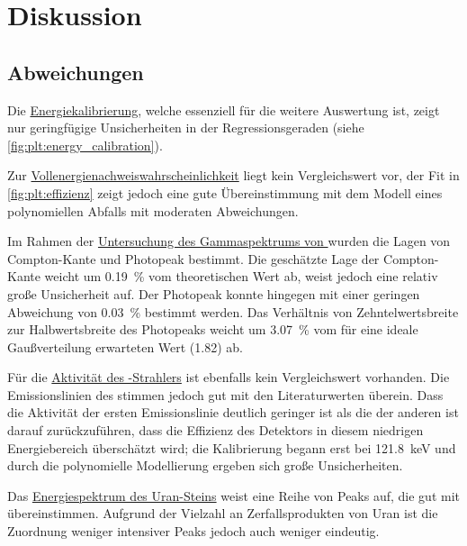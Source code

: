 \section{Diskussion}
\label{sec:diskussion}

\subsection{Abweichungen}
Die \hyperref[sec:auswertung:energiekalibrierung]{Energiekalibrierung},
    welche essenziell für die weitere Auswertung ist,
zeigt nur geringfügige Unsicherheiten in der Regressionsgeraden (siehe \autoref{fig:plt:energy_calibration}).

Zur \hyperref[sec:auswertung:effizienz]{Vollenergienachweiswahrscheinlichkeit} liegt kein Vergleichswert vor,
der Fit in \autoref{fig:plt:effizienz} zeigt jedoch eine gute Übereinstimmung mit dem Modell eines polynomiellen Abfalls mit moderaten Abweichungen.

Im Rahmen der \hyperref[sec:auswertung:Cs_137]{Untersuchung des Gammaspektrums von }
wurden die Lagen von Compton-Kante und Photopeak bestimmt.
Die geschätzte Lage der Compton-Kante weicht um \SI{0.19}{\percent} vom theoretischen Wert ab,
weist jedoch eine relativ große Unsicherheit auf.
Der Photopeak konnte hingegen mit einer geringen Abweichung von \SI{0.03}{\percent} bestimmt werden.
Das Verhältnis von Zehntelwertsbreite zur Halbwertsbreite des Photopeaks
weicht um \SI{3.07}{\percent} vom für eine ideale Gaußverteilung erwarteten Wert (\num{1.82}) ab.

Für die \hyperref[sec:auswertung:Ba_133]{Aktivität des -Strahlers} ist ebenfalls kein Vergleichswert vorhanden.
Die Emissionslinien des  stimmen jedoch gut mit den Literaturwerten \cite{lara} überein.
Dass die Aktivität der ersten Emissionslinie deutlich geringer ist als die der anderen %
ist darauf zurückzuführen,
dass die Effizienz des Detektors in diesem niedrigen Energiebereich überschätzt wird;
die Kalibrierung begann erst bei \SI{121.8}{\kilo\electronvolt}
und durch die polynomielle Modellierung ergeben sich große Unsicherheiten.

Das \hyperref[sec:auswertung:uranstein]{Energiespektrum des Uran-Steins} weist eine Reihe von Peaks auf,
die gut mit  übereinstimmen.
Aufgrund der Vielzahl an Zerfallsprodukten von Uran ist die Zuordnung weniger intensiver Peaks jedoch auch weniger eindeutig.



